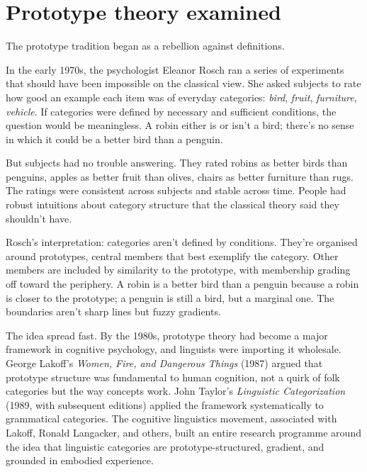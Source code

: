 \section{Prototype theory examined}

The prototype tradition began as a rebellion against definitions.

In the early 1970s, the psychologist Eleanor Rosch ran a series of experiments that should have been impossible on the classical view. She asked subjects to rate how good an example each item was of everyday categories: \textit{bird}, \textit{fruit}, \textit{furniture}, \textit{vehicle}. If categories were defined by necessary and sufficient conditions, the question would be meaningless. A robin either is or isn't a bird; there's no sense in which it could be a better bird than a penguin.

But subjects had no trouble answering. They rated robins as better birds than penguins, apples as better fruit than olives, chairs as better furniture than rugs. The ratings were consistent across subjects and stable across time. People had robust intuitions about category structure that the classical theory said they shouldn't have.

Rosch's interpretation: categories aren't defined by conditions. They're organised around prototypes, central members that best exemplify the category. Other members are included by similarity to the prototype, with membership grading off toward the periphery. A robin is a better bird than a penguin because a robin is closer to the prototype; a penguin is still a bird, but a marginal one. The boundaries aren't sharp lines but fuzzy gradients.

The idea spread fast. By the 1980s, prototype theory had become a major framework in cognitive psychology, and linguists were importing it wholesale. George Lakoff's \textit{Women, Fire, and Dangerous Things} (1987) argued that prototype structure was fundamental to human cognition, not a quirk of folk categories but the way concepts work. John Taylor's \textit{Linguistic Categorization} (1989, with subsequent editions) applied the framework systematically to grammatical categories. The cognitive linguistics movement, associated with Lakoff, Ronald Langacker, and others, built an entire research programme around the idea that linguistic categories are prototype-structured, gradient, and grounded in embodied experience.

